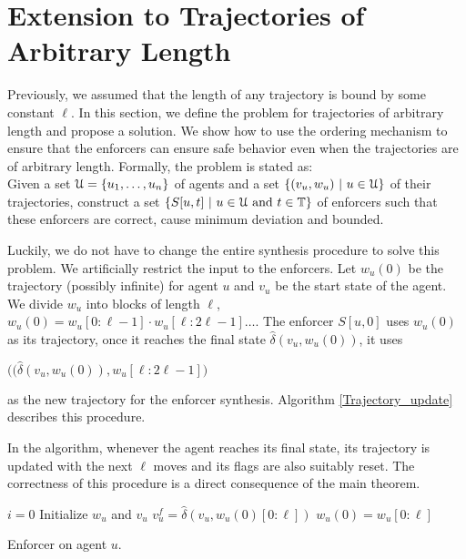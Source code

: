 \section{Extension to Trajectories of Arbitrary Length}

Previously, we assumed that the length of any trajectory is bound by some constant $\ell$. %
In this section, we define the problem for trajectories of arbitrary length and propose a solution. We show how to use the ordering mechanism to ensure that the enforcers can ensure safe behavior even when the trajectories are of arbitrary length. Formally, the problem is stated as: \\


Given a set $\mathcal{U} = \{u_1,\dots,u_n\}$ of agents and a set $\{(v_u,w_u)~|~u \in \mathcal{U} \}$ of their trajectories, 
construct a set $\{S[u,t]~|~u \in \mathcal{U} \text{ and } t \in \mathbb{T}\}$ of enforcers such that these enforcers are correct, cause minimum deviation and bounded. 


Luckily, we do not have to change the entire synthesis procedure to solve this problem. We artificially restrict the input to the enforcers. Let $w_u(0)$ be the trajectory (possibly infinite) for agent $u$ and $v_u$ be the start state of the agent. 
We divide $w_u$ into blocks of length $\ell$, $w_u(0) =w_u[0:\ell-1]\cdot w_u[\ell:2\ell-1]\dots.$ The enforcer $S[u,0]$ uses $w_u(0)$ as its trajectory, once it reaches the final state $\hat{\delta}(v_u,w_u(0))$, it uses \begin{small}$\big( (\hat{\delta}(v_u,w_u(0)),  w_u[\ell:2\ell-1] \big)$ \end{small} as the new trajectory for the enforcer synthesis. Algorithm \ref{Trajectory_update} describes this procedure.


In the algorithm, whenever the agent reaches its final state, its trajectory is updated with the next $\ell$ moves and its flags are also suitably reset. The correctness of this procedure is a direct consequence of the main theorem.


\begin{algorithm}
$i=0$\;
Initialize $w_u$ and $v_u$\;
$v_u^f = \hat{\delta}(v_u,w_u(0)[0:\ell])$\;
$w_u(0) = w_u[0:\ell]$\;
\caption{Enforcer on agent $u$.}
\label{Trajectory_update}
\end{algorithm}

